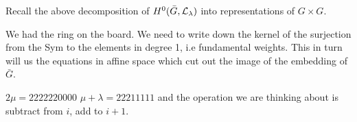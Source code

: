 \documentclass[12pt]{article}
\begin{document}
Recall the above decomposition of $H^0(\bar{G},{\mathcal{L}}_\lambda)$ into representations of $G\times G$.

We had the ring on the board.
We need to write down the kernel of the surjection from the Sym to the elements in degree 1, i.e fundamental weights.
This in turn will us the equations in affine space which cut out the image of the embedding of $\bar{G}$.

\hfill

$2\mu = 2222220000$
$\mu + \lambda = 22211111$
and the operation we are thinking about is subtract from $i$, add to $i+1$. 
\end{document}
